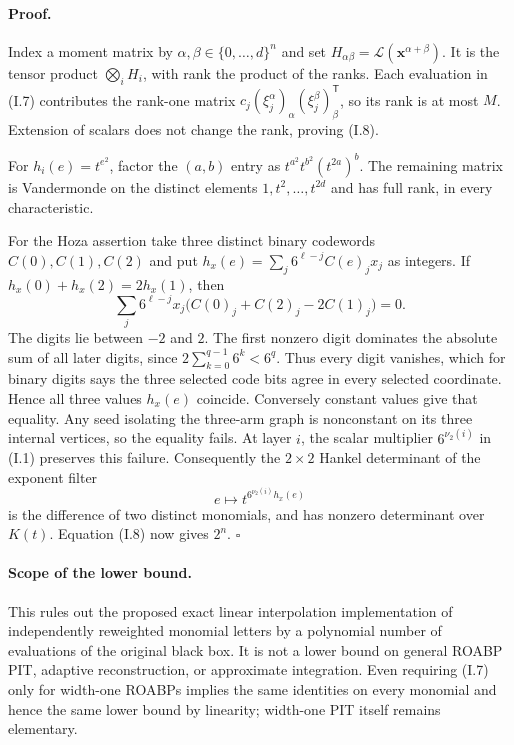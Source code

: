 \documentclass[11pt,a4paper]{article}
\theoremstyle{definition}\newtheorem{definition}{Definition}
\begin{document}
\paragraph{Proof.}
Index a moment matrix by
$\alpha,\beta\in\{0,\ldots,d\}^n$ and set
$H_{\alpha\beta}=\mathcal L(\mathbf x^{\alpha+\beta})$.
It is the tensor product $\bigotimes_iH_i$, with rank the product
of the ranks.  Each evaluation in (I.7) contributes the rank-one
matrix $c_j(\xi_j^\alpha)_\alpha(\xi_j^\beta)_\beta^{\mathsf T}$,
so its rank is at most $M$.  Extension of scalars does not change
the rank, proving (I.8).

For $h_i(e)=t^{e^2}$, factor the $(a,b)$ entry as
$t^{a^2}t^{b^2}(t^{2a})^b$.  The remaining matrix is Vandermonde
on the distinct elements $1,t^2,\ldots,t^{2d}$ and has full rank,
in every characteristic.

For the Hoza assertion take three distinct binary codewords
$C(0),C(1),C(2)$ and put
$h_x(e)=\sum_j6^{\ell-j}C(e)_j x_j$ as integers.
If $h_x(0)+h_x(2)=2h_x(1)$, then
\[
 \sum_j6^{\ell-j}x_j\bigl(C(0)_j+C(2)_j-2C(1)_j\bigr)=0.
\]
The digits lie between $-2$ and $2$.  The first nonzero digit
dominates the absolute sum of all later digits, since
$2\sum_{k=0}^{q-1}6^k<6^q$.  Thus every digit vanishes, which for
binary digits says the three selected code bits agree in every
selected coordinate.  Hence all three values $h_x(e)$ coincide.
Conversely constant values give that equality.  Any seed isolating
the three-arm graph is nonconstant on its three internal vertices,
so the equality fails.  At layer $i$, the scalar multiplier
$6^{\nu_2(i)}$ in (I.1) preserves this failure.  Consequently the
$2\times2$ Hankel determinant of the exponent filter
\[
 e\longmapsto t^{6^{\nu_2(i)}h_x(e)}
\]
is the difference of two distinct monomials, and has nonzero
determinant over $K(t)$.  Equation (I.8) now gives $2^n$.
\hfill$\square$

\paragraph{Scope of the lower bound.}
This rules out the proposed exact linear interpolation implementation
of independently reweighted monomial letters by a polynomial number
of evaluations of the original black box.  It is not a lower bound
on general ROABP PIT, adaptive reconstruction, or approximate
integration.  Even requiring (I.7) only for width-one ROABPs implies
the same identities on every monomial and hence the same lower
bound by linearity; width-one PIT itself remains elementary.
\end{document}
